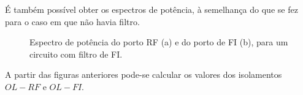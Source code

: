 \documentclass[11pt]{article}
\numberwithin{equation}{section}
\begin{document}
É também possível obter os espectros de potência, à semelhança do que se fez para o caso em que não havia filtro.

\begin{figure}[h]
	\centering
	\hspace{8mm}
	\vspace{-0.8em}
	\caption{Espectro de potência do porto RF (a) e do porto de FI (b), para um circuito com filtro de FI.}
	\vspace{-0.8em}
\end{figure}

A partir das figuras anteriores pode-se calcular os valores dos isolamentos $OL - RF$ e $OL - FI$.
\end{document}
